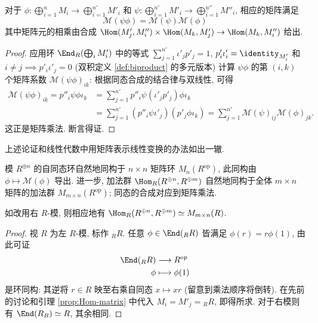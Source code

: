 \begin{lemma}\label{prop:Hom-matrix}
	对于 $\phi: \bigoplus_{i=1}^n M_i \to \bigoplus_{i=1}^{n'} M'_i$ 和 $\psi: \bigoplus_{i=1}^{n'} M'_i \to \bigoplus_{i=1}^{n''} M''_i$, 相应的矩阵满足
	\[ \mathcal{M}(\psi\phi) = \mathcal{M}(\psi) \mathcal{M}(\phi) \]
	其中矩阵元的相乘由合成 $\Hom(M'_j, M''_i) \times \Hom(M_k, M'_j) \to \Hom(M_k, M''_i)$ 给出.
\end{lemma}
\begin{proof}
	应用环 $\End_R(\bigoplus_i M'_i)$ 中的等式 $\sum_{j=1}^{n'} \iota'_j p'_j = 1$, $p'_i \iota'_i = \identity_{M'_i}$ 和 $i \neq j \implies p'_i \iota'_j = 0$ (双积定义 \ref{def:biproduct} 的多元版本) 计算 $\psi\phi$ 的第 $(i, k)$ 个矩阵系数 $\mathcal{M}(\psi\phi)_{ik}$: 根据同态合成的结合律与双线性, 可得
	\begin{align*}
		\mathcal{M}(\psi\phi)_{ik} = p''_i \psi\phi \iota_k & = \sum_{j=1}^{n'} p''_i \psi (\iota'_j p'_j) \phi \iota_k \\
		& = \sum_{j=1}^{n'} (p''_i \psi \iota'_j) (p'_j \phi \iota_k) = \sum_{j=1}^{n'} \mathcal{M}(\psi)_{ij} \mathcal{M}(\phi)_{jk}.
	\end{align*}
	这正是矩阵乘法. 断言得证.
\end{proof}

上述论证和线性代数中用矩阵表示线性变换的办法如出一辙.
\begin{proposition}\label{prop:End-matrix}
	模 $R^{\oplus n}$ 的自同态环自然地同构于 $n \times n$ 矩阵环 $M_n(R^\text{op})$, 此同构由 $\phi \mapsto \mathcal{M}(\phi)$ 导出. 进一步, 加法群 $\Hom_R(R^{\oplus n}, R^{\oplus m})$ 自然地同构于全体 $m \times n$ 矩阵的加法群 $M_{m \times n}(R^\text{op})$; 同态的合成对应到矩阵乘法.
	
	如改用右 $R$-模, 则相应地有 $\Hom_R(R^{\oplus n}, R^{\oplus m}) \simeq M_{m \times n}(R)$.
\end{proposition}
\begin{proof}
	视 $R$ 为左 $R$-模, 标作 ${}_R R$. 任意 $\phi \in \End({}_R R)$ 皆满足 $\phi(r) = r\phi(1)$, 由此可证
	\begin{align*}
		\End({}_R R) & \longrightarrow R^\text{op} \\
		\phi & \longmapsto \phi(1)
	\end{align*}
	是环同构: 其逆将 $r \in R$ 映至右乘自同态 $x \mapsto xr$ (留意到乘法顺序将倒转). 在先前的讨论和引理 \ref{prop:Hom-matrix} 中代入 $M_i = M'_j = {}_R R$, 即得所求. 对于右模则有 $\End(R_R) \simeq R$, 其余相同.
\end{proof}

